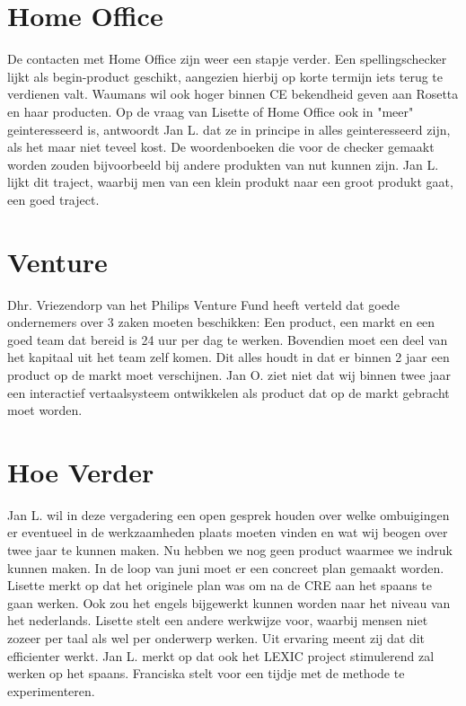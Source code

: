 \section {Home Office}
De contacten met Home Office zijn weer een stapje verder. Een spellingschecker
lijkt als begin-product geschikt, aangezien hierbij op korte termijn iets terug 
te verdienen valt. 
Waumans wil 
ook hoger binnen CE bekendheid geven aan Rosetta en haar producten.
Op de vraag van Lisette of Home Office ook in "meer" geinteresseerd is, 
antwoordt Jan L. dat ze in principe in alles geinteresseerd zijn, als het maar 
niet teveel kost. De woordenboeken die voor de checker gemaakt worden zouden 
bijvoorbeeld bij andere produkten van nut kunnen zijn. Jan L. lijkt dit 
traject, waarbij men van een klein produkt naar een groot produkt gaat, een 
goed traject.

\section {Venture}
Dhr. Vriezendorp van het Philips Venture Fund heeft  verteld dat goede 
ondernemers over 3 zaken moeten beschikken: Een product, een markt en 
een goed team dat bereid is 24 uur per dag te werken. 
Bovendien moet een deel van 
het kapitaal uit het team zelf komen. Dit alles houdt in dat er binnen 2 jaar 
een 
product op de markt moet verschijnen. Jan O. ziet niet dat wij binnen twee jaar een interactief 
vertaalsysteem ontwikkelen als product dat op de markt gebracht moet worden. 

\section {Hoe Verder}
Jan L. wil in deze vergadering een open gesprek houden over welke ombuigingen 
er eventueel in de werkzaamheden plaats moeten vinden en wat wij beogen over 
twee jaar te kunnen maken. Nu hebben we nog geen product waarmee we indruk 
kunnen maken. In de loop van juni moet er een concreet plan gemaakt worden.
Lisette merkt op dat het originele plan was om na de CRE aan het spaans te gaan 
werken. Ook zou het engels bijgewerkt kunnen worden naar het niveau van het 
nederlands. Lisette stelt een andere werkwijze voor, waarbij mensen niet zozeer 
per taal als wel per onderwerp werken. Uit ervaring meent zij dat dit 
efficienter werkt. Jan L. merkt op dat ook het LEXIC project stimulerend zal 
werken op het spaans. Franciska stelt voor een 
tijdje met de methode te experimenteren.\\

